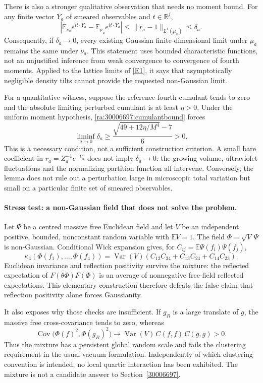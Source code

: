 \documentclass[11pt]{article}
\newcommand{\R}{\mathbb{R}}
\newcommand{\E}{\mathbb{E}}
\newcommand{\eref}[2]{\hyperlink{extra:#1:#2}{[E#2]}}
\begin{document}
There is also a stronger qualitative observation that needs no moment
bound. For any finite vector $Y_a$ of smeared observables and $t\in\R^j$,
\begin{equation}\label{ra:30006697:characteristic}
 \left|\E_{\nu_a}e^{i t\cdot Y_a}-\E_{\mu_a}e^{i t\cdot Y_a}\right|
 \le\|r_a-1\|_{L^1(\mu_a)}\le\delta_a.
\end{equation}
Consequently, if $\delta_a\to0$, every existing Gaussian finite-dimensional
limit under $\mu_a$ remains the same under $\nu_a$. This statement uses
bounded characteristic functions, not an unjustified inference from weak
convergence to convergence of fourth moments. Applied to the lattice
limits of \eref{30006697}{1}, it says that asymptotically negligible density
tilts cannot provide the requested non-Gaussian limit.

For a quantitative witness, suppose the reference fourth cumulant tends
to zero and the absolute limiting perturbed cumulant is at least $\eta>0$.
Under the uniform moment hypothesis, \eqref{ra:30006697:cumulantbound} forces
\[
 \liminf_{a\to0}\delta_a
 \ge \frac{\sqrt{49+12\eta/M^4}-7}{6}>0.
\]
This is a necessary condition, not a sufficient construction criterion.
A small bare coefficient in $r_a=Z_a^{-1}e^{-V_a}$ does not imply
$\delta_a\to0$: the growing volume, ultraviolet fluctuations and the
normalizing partition function all intervene. Conversely, the lemma does
not rule out a perturbation large in microscopic total variation but small
on a particular finite set of smeared observables.

\paragraph{Stress test: a non-Gaussian field that does not solve the problem.}
Let $\Psi$ be a centred massive free Euclidean field and let $V$ be an
independent positive, bounded, nonconstant random variable with $\E V=1$.
The field $\Phi=\sqrt V\,\Psi$ is non-Gaussian. Conditional Wick expansion
gives, for $C_{ij}=\E\Psi(f_i)\Psi(f_j)$,
\[
 \kappa_4(\Phi(f_1),\ldots,\Phi(f_4))
 =\operatorname{Var}(V)
   (C_{12}C_{34}+C_{13}C_{24}+C_{14}C_{23}).
\]
Euclidean invariance and reflection positivity survive the mixture:
the reflected expectation of $\overline{F(\theta\Phi)}F(\Phi)$ is an
average of nonnegative free-field reflected expectations. This elementary
construction therefore defeats the false claim that reflection positivity
alone forces Gaussianity.

It also exposes why those checks are insufficient. If $g_R$ is a large
translate of $g$, the massive free cross-covariance tends to zero, whereas
\[
 \operatorname{Cov}\bigl(\Phi(f)^2,\Phi(g_R)^2\bigr)
 \longrightarrow
 \operatorname{Var}(V)\,C(f,f)\,C(g,g)>0.
\]
Thus the mixture has a persistent global random scale and fails the
clustering requirement in the usual vacuum formulation. Independently of
which clustering convention is intended, no local quartic interaction has
been exhibited. The mixture is not a candidate answer to Section~\ref{30006697}.
\end{document}
